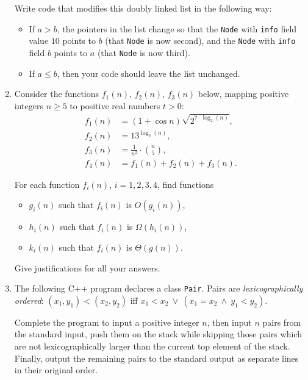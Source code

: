 \documentclass[a4paper,12pt]{article}
\begin{document}
\begin{enumerate}
Write code that modifies this doubly linked list in the following way:
\begin{itemize}
\item If $a > b$, the pointers in the list change so that the \texttt{Node} with \texttt{info} field value $10$ points to $b$ (that \texttt{Node} is now second), and the \texttt{Node} with \texttt{info} field $b$ points to $a$ (that \texttt{Node} is now third). 
\item If $a \leq b$, then your code should leave the list unchanged.
\end{itemize}

\vfill
\clearpage

\item

Consider the functions $f_1(n)$, $f_2(n)$, $f_3(n)$ below, mapping positive integers $n \geq 5$
to positive real numbers $t>0$: 
% 
\begin{align*}
f_1(n) & = (1 + \cos n) \sqrt{2^{7 \cdot \log_2 (n)}},\\
f_2(n) & = 13^{\log_2 (n)},\\
f_3(n) & = \frac{1}{n^2} \cdot {n \choose 5},\\
f_4(n) & = f_1(n) + f_2(n) + f_3(n).
\end{align*}

For each function $f_i(n)$, $i=1,2,3,4$, find functions 
\begin{itemize}
\item $g_i(n)$ such that $f_i(n)$ is $O(g_i(n))$,
\item $h_i(n)$ such that $f_i(n)$ is $\Omega(h_i(n))$, 
\item $k_i(n)$ such that $f_i(n)$ is $\Theta(g(n))$. 
\end{itemize}
Give justifications for all your answers.


\item

The following C++ program declares a class {\tt Pair}. 
Pairs are {\em lexicographically ordered}: 
$(x_1, y_1) < (x_2, y_2)$ iff $x_1 < x_2\ \vee\ (x_1 = x_2\ \wedge\ y_1 < y_2)$. 

Complete the program to input a positive integer $n$, then input $n$ pairs from the standard input, 
push them on the stack while skipping those pairs which are not lexicographically larger
than the current top element of the stack. Finally, output the remaining
pairs to the standard output as separate lines in their original order.


\end{enumerate}
\end{document}
